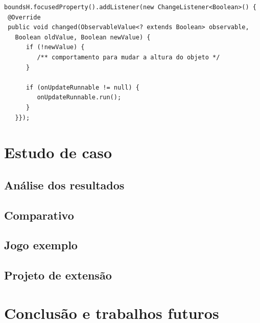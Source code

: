 \documentclass[12pt,twoside,openright,a4paper,english,brazil,sumario=tradicional]{abntex2}
\begin{document}
\begin{mylisting}[h]
\begin{lstlisting}
boundsH.focusedProperty().addListener(new ChangeListener<Boolean>() {
 @Override
 public void changed(ObservableValue<? extends Boolean> observable,
   Boolean oldValue, Boolean newValue) {
      if (!newValue) {
         /** comportamento para mudar a altura do objeto */
      }

      if (onUpdateRunnable != null) {
         onUpdateRunnable.run();
      }
   }});
\end{lstlisting}
\end{mylisting}


\chapter{Estudo de caso}
\label{chap:caso}
\section{Análise dos resultados}
\section{Comparativo}
\section{Jogo exemplo}
\section{Projeto de extensão}

\chapter{Conclusão e trabalhos futuros}
\label{chap:conclcsao}

\postextual

\end{document}
